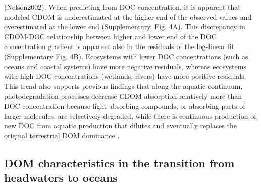 (Nelson2002). When predicting  from DOC concentration, it is apparent that modeled CDOM is underestimated at the higher end of the observed values and overestimated at the lower end (Supplementary. Fig. 4A). This discrepancy in CDOM-DOC relationship between higher and lower end of the DOC concentration gradient is apparent also in the residuals of the log-linear fit (Supplementary Fig. 4B). Ecosystems with lower DOC concentrations (such as oceans and coastal systems) have more negative residuals, whereas ecosystems with high DOC concentrations (wetlands, rivers) have more positive residuals. This trend also supports previous findings that along the aquatic continuum, photodegradation processes decrease CDOM absorption relatively more than DOC concentration \citep{Vahatalo2004} because light absorbing compounds, or absorbing parts of larger molecules, are selectively degraded, while there is continuous production of new DOC from aquatic production that dilutes and eventually replaces the original terrestrial DOM dominance \citep{Markager2011}.

\subsection*{DOM characteristics in the transition from headwaters to oceans}


